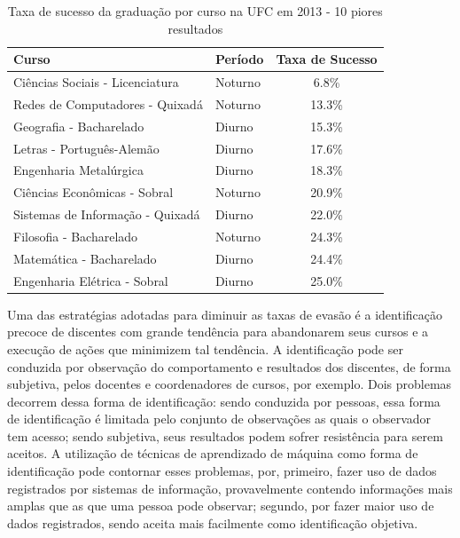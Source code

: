 \begin{table}
\begin{tabular}{llc}
\toprule
                            Curso &  Período & Taxa de Sucesso \\
\midrule
  Ciências Sociais - Licenciatura &  Noturno &            6.8\% \\
  Redes de Computadores - Quixadá &  Noturno &           13.3\% \\
          Geografia - Bacharelado &   Diurno &           15.3\% \\
        Letras - Português-Alemão &   Diurno &           17.6\% \\
           Engenharia Metalúrgica &   Diurno &           18.3\% \\
     Ciências Econômicas - Sobral &  Noturno &           20.9\% \\
 Sistemas de Informação - Quixadá &   Diurno &           22.0\% \\
          Filosofia - Bacharelado &  Noturno &           24.3\% \\
         Matemática - Bacharelado &   Diurno &           24.4\% \\
     Engenharia Elétrica - Sobral &   Diurno &           25.0\% \\
\bottomrule
\end{tabular}
\caption{Taxa de sucesso da graduação por curso na UFC em 2013 - 10 piores resultados}
\label{table:ts_2013}
\end{table}

Uma das estratégias adotadas para diminuir as taxas de evasão é a identificação precoce de discentes com grande tendência para abandonarem seus cursos e a execução de ações que minimizem tal tendência. A identificação pode ser conduzida por observação do comportamento e resultados dos discentes, de forma subjetiva, pelos docentes e coordenadores de cursos, por exemplo. Dois problemas decorrem dessa forma de identificação: sendo conduzida por pessoas, essa forma de identificação é limitada pelo conjunto de observações as quais o observador tem acesso; sendo subjetiva, seus resultados podem sofrer resistência para serem aceitos. A utilização de técnicas de aprendizado de máquina como forma de identificação pode contornar esses problemas, por, primeiro, fazer uso de dados registrados por sistemas de informação, provavelmente contendo informações mais amplas que as que uma pessoa pode observar; segundo, por fazer maior uso de dados registrados, sendo aceita mais facilmente como identificação objetiva. 

